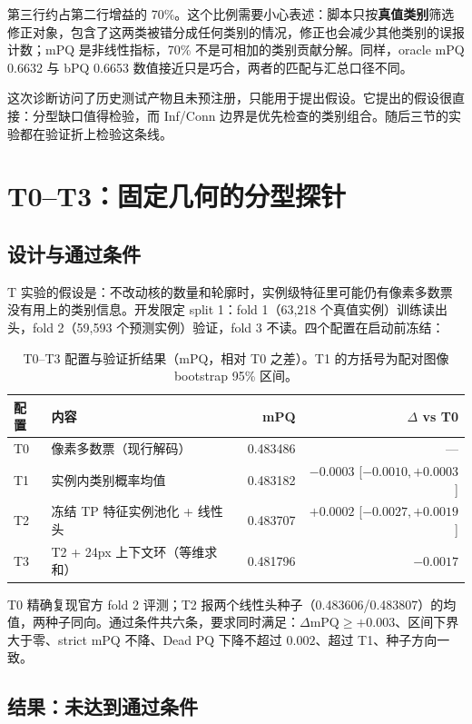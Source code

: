 \documentclass[11pt,a4paper,UTF8,fontset=fandol]{ctexart}
\begin{document}
第三行约占第二行增益的 70\%。这个比例需要小心表述：脚本只按\textbf{真值类别}筛选修正对象，包含了这两类被错分成任何类别的情况，修正也会减少其他类别的误报计数；mPQ 是非线性指标，70\% 不是可相加的类别贡献分解\cite{structure}。同样，oracle mPQ 0.6632 与 bPQ 0.6653 数值接近只是巧合，两者的匹配与汇总口径不同。

这次诊断访问了历史测试产物且未预注册，只能用于提出假设。它提出的假设很直接：分型缺口值得检验，而 Inf/Conn 边界是优先检查的类别组合。随后三节的实验都在验证折上检验这条线。

\section{T0--T3：固定几何的分型探针}

\subsection{设计与通过条件}

T 实验\cite{specs}的假设是：不改动核的数量和轮廓时，实例级特征里可能仍有像素多数票没有用上的类别信息。开发限定 split 1：fold 1（63,218 个真值实例）训练读出头，fold 2（59,593 个预测实例）验证，fold 3 不读。四个配置在启动前冻结：

\begin{table}[H]
\centering\small
\caption{T0--T3 配置与验证折结果（mPQ，相对 T0 之差）。T1 的方括号为配对图像 bootstrap 95\% 区间。}
\label{tab:t}
\begin{tabular}{llrr}\toprule
配置 & 内容 & mPQ & $\Delta$ vs T0\\\midrule
T0 & 像素多数票（现行解码） & 0.483486 & —\\
T1 & 实例内类别概率均值 & 0.483182 & $-0.0003$ [$-0.0010,+0.0003$]\\
T2 & 冻结 TP 特征实例池化 + 线性头 & 0.483707 & $+0.0002$ [$-0.0027,+0.0019$]\\
T3 & T2 + 24px 上下文环（等维求和） & 0.481796 & $-0.0017$\\
\bottomrule
\end{tabular}
\end{table}

T0 精确复现官方 fold 2 评测；T2 报两个线性头种子（0.483606/0.483807）的均值，两种子同向。通过条件共六条，要求同时满足：$\Delta\text{mPQ}\geq+0.003$、区间下界大于零、strict mPQ 不降、Dead PQ 下降不超过 $0.002$、超过 T1、种子方向一致。

\subsection{结果：未达到通过条件}
\end{document}

